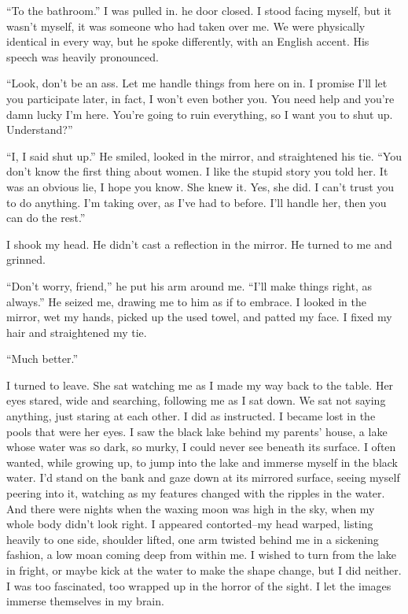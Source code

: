 ``To the bathroom.'' I was pulled in. he door closed. I stood facing
myself, but it wasn't myself, it was someone who had taken over me. We
were physically identical in every way, but he spoke differently, with
an English accent. His speech was heavily pronounced.

``Look, don't be an ass. Let me handle things from here on in. I promise
I'll let you participate later, in fact, I won't even bother you. You
need help and you're damn lucky I'm here. You're going to ruin
everything, so I want you to shut up. Understand?''

``I, I said shut up.'' He smiled, looked in the mirror, and straightened
his tie. ``You don't know the first thing about women. I like the stupid
story you told her. It was an obvious lie, I hope you know. She knew it.
Yes, she did. I can't trust you to do anything. I'm taking over, as I've
had to before. I'll handle her, then you can do the rest.''

I shook my head. He didn't cast a reflection in the mirror. He turned to
me and grinned.

``Don't worry, friend,'' he put his arm around me. ``I'll make things
right, as always.'' He seized me, drawing me to him as if to embrace. I
looked in the mirror, wet my hands, picked up the used towel, and patted
my face. I fixed my hair and straightened my tie.

``Much better.''

I turned to leave. She sat watching me as I made my way back to the
table. Her eyes stared, wide and searching, following me as I sat down.
We sat not saying anything, just staring at each other. I did as
instructed. I became lost in the pools that were her eyes. I saw the
black lake behind my parents' house, a lake whose water was so dark, so
murky, I could never see beneath its surface. I often wanted, while
growing up, to jump into the lake and immerse myself in the black water.
I'd stand on the bank and gaze down at its mirrored surface, seeing
myself peering into it, watching as my features changed with the ripples
in the water. And there were nights when the waxing moon was high in the
sky, when my whole body didn't look right. I appeared contorted--my head
warped, listing heavily to one side, shoulder lifted, one arm twisted
behind me in a sickening fashion, a low moan coming deep from within me.
I wished to turn from the lake in fright, or maybe kick at the water to
make the shape change, but I did neither. I was too fascinated, too
wrapped up in the horror of the sight. I let the images immerse
themselves in my brain.

